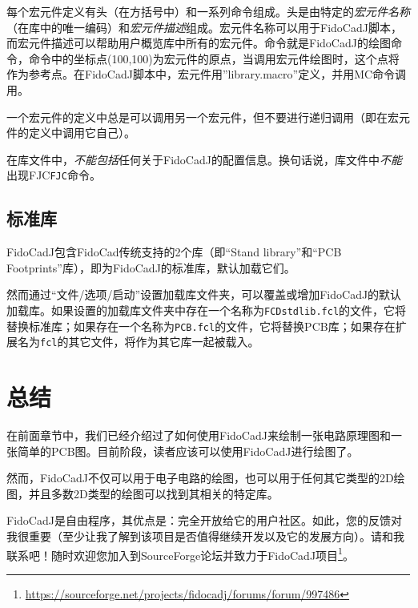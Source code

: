 \documentclass[10pt,a4paper,twoside]{scrreprt}
\begin{document}
每个宏元件定义有头（在方括号中）和一系列命令组成。头是由特定的\emph{宏元件名称}（在库中的唯一编码）和\emph{宏元件描述}组成。宏元件名称可以用于FidoCadJ脚本，而宏元件描述可以帮助用户概览库中所有的宏元件。命令就是FidoCadJ的绘图命令，命令中的坐标点(100,100)为宏元件的原点，当调用宏元件绘图时，这个点将作为参考点。在FidoCadJ脚本中，宏元件用{}”library.macro”定义，并用MC命令调用。

一个宏元件的定义中总是可以调用另一个宏元件，但不要进行递归调用（即在宏元件的定义中调用它自己）。

在库文件中，\textit{不能包括}任何关于FidoCadJ的配置信息。换句话说，库文件中\textit{不能}出现FJC\lstinline!FJC!命令。

\section{标准库}

FidoCadJ包含FidoCad传统支持的2个库（即“Stand library”和“PCB Footprints”库），即为FidoCadJ的标准库，默认加载它们。

然而通过“文件/选项/启动”设置加载库文件夹，可以覆盖或增加FidoCadJ的默认加载库。如果设置的加载库文件夹中存在一个名称为\lstinline!FCDstdlib.fcl!的文件，它将替换标准库；如果存在一个名称为\lstinline!PCB.fcl!的文件，它将替换PCB库；如果存在扩展名为\lstinline!fcl!的其它文件，将作为其它库一起被载入。

\chapter{总结}

在前面章节中，我们已经介绍过了如何使用FidoCadJ来绘制一张电路原理图和一张简单的PCB图。目前阶段，读者应该可以使用FidoCadJ进行绘图了。

然而，FidoCadJ不仅可以用于电子电路的绘图，也可以用于任何其它类型的2D绘图，并且多数2D类型的绘图可以找到其相关的特定库。

FidoCadJ是自由程序，其优点是：完全开放给它的用户社区。如此，您的反馈对我很重要（至少让我了解到该项目是否值得继续开发以及它的发展方向）。请和我联系吧！随时欢迎您加入到SourceForge论坛并致力于FidoCadJ项目\footnote{\href{https://sourceforge.net/projects/fidocadj/forums/forum/997486}{https://sourceforge.net/projects/fidocadj/forums/forum/997486}}。

\appendix
\end{document}
